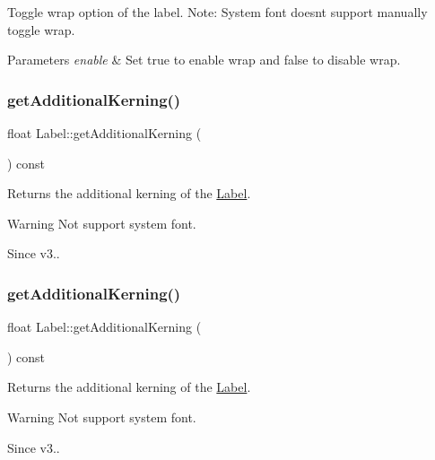 Toggle wrap option of the label. Note\+: System font doesn\textquotesingle{}t support manually toggle wrap.


\begin{DoxyParams}{Parameters}
{\em enable} & Set true to enable wrap and false to disable wrap. \\
\hline
\end{DoxyParams}
\mbox{\label{classLabel_a4dc8b796743eddc146f8f248b08a7db6}} 
\subsubsection{\texorpdfstring{get\+Additional\+Kerning()}{getAdditionalKerning()}\hspace{0.1cm}{\footnotesize\ttfamily [1/2]}}
{\footnotesize\ttfamily float Label\+::get\+Additional\+Kerning (\begin{DoxyParamCaption}{ }\end{DoxyParamCaption}) const}

Returns the additional kerning of the \hyperlink{classLabel}{Label}.

\begin{DoxyWarning}{Warning}
Not support system font. 
\end{DoxyWarning}
\begin{DoxySince}{Since}
v3.. 
\end{DoxySince}
\mbox{\label{classLabel_a4dc8b796743eddc146f8f248b08a7db6}} 
\subsubsection{\texorpdfstring{get\+Additional\+Kerning()}{getAdditionalKerning()}\hspace{0.1cm}{\footnotesize\ttfamily [2/2]}}
{\footnotesize\ttfamily float Label\+::get\+Additional\+Kerning (\begin{DoxyParamCaption}{ }\end{DoxyParamCaption}) const}

Returns the additional kerning of the \hyperlink{classLabel}{Label}.

\begin{DoxyWarning}{Warning}
Not support system font. 
\end{DoxyWarning}
\begin{DoxySince}{Since}
v3.. 
\end{DoxySince}
\mbox{\label{classLabel_a30dc940bd64a7b34f7facee0c9c8d2ab}} 

